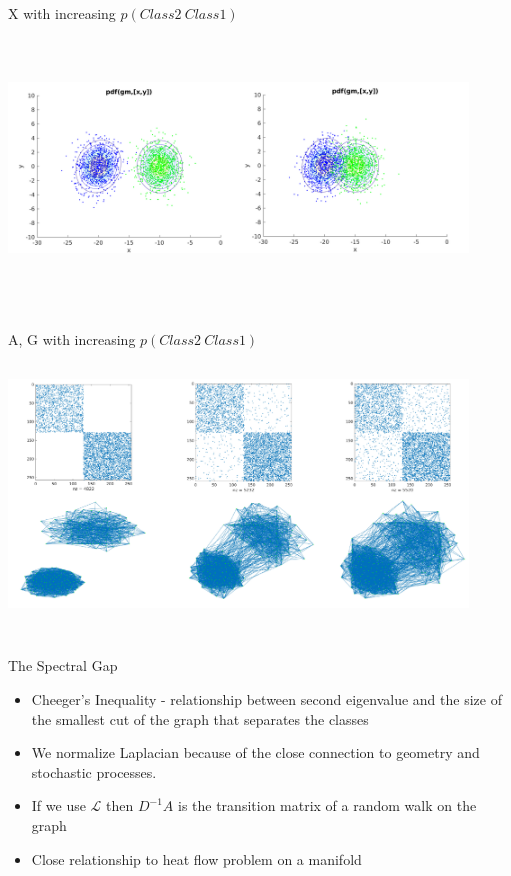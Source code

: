\documentclass{beamer}
\begin{document}
\begin{frame}{X with increasing $p(Class2  ~ Class1)$ }
\includegraphics[width=4.8in,height=3.0in]{images/class_dist.png}
\end{frame}


\begin{frame}{A, G with increasing $p(Class2  ~ Class1)$ }
\includegraphics[width=4.8in,height=3.0in]{images/crosstalk.png}
\end{frame}


\begin{frame}{The Spectral Gap}
\begin{itemize}
    \item Cheeger's Inequality - relationship between second eigenvalue and the size of the smallest cut of the graph that separates the classes
    \item We normalize Laplacian because of the close connection to geometry and stochastic processes.  
    \item If we use $\mathcal{L} $ then $D^{-1} A$ is the transition matrix of a random walk on the graph
    \item Close relationship to heat flow problem on a manifold 
\end{itemize}
\end{frame}
\end{document}
